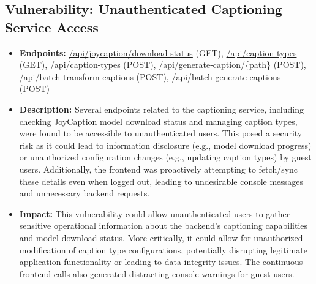 \documentclass{article}
\begin{document}
\subsection{\texorpdfstring{\textbf{Vulnerability: Unauthenticated Captioning Service Access}}{Vulnerability: Unauthenticated Captioning Service Access}}
\begin{itemize}
    \item \textbf{Endpoints:} \url{/api/joycaption/download-status} (GET),
    \url{/api/caption-types} (GET), \url{/api/caption-types} (POST),
    \url{/api/generate-caption/{path}} (POST),
    \url{/api/batch-transform-captions} (POST),
    \url{/api/batch-generate-captions} (POST)
    \item \textbf{Description:}
    Several endpoints related to the captioning service, including checking JoyCaption model download status and managing caption types, were found to be accessible to unauthenticated users. This posed a security risk as it could lead to information disclosure (e.g., model download progress) or unauthorized configuration changes (e.g., updating caption types) by guest users. Additionally, the frontend was proactively attempting to fetch/sync these details even when logged out, leading to undesirable console messages and unnecessary backend requests.
    \item \textbf{Impact:}
    This vulnerability could allow unauthenticated users to gather sensitive operational information about the backend's captioning capabilities and model download status. More critically, it could allow for unauthorized modification of caption type configurations, potentially disrupting legitimate application functionality or leading to data integrity issues. The continuous frontend calls also generated distracting console warnings for guest users.
\end{itemize}
\end{document}
